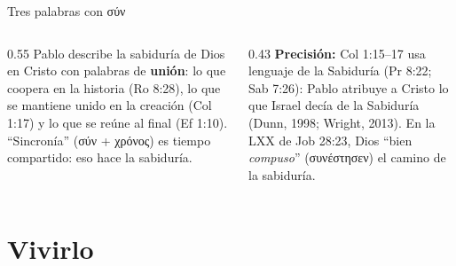 \documentclass[hyperref={bookmarks=false},aspectratio=169]{beamer}
\newcommand{\grc}[1]{\foreignlanguage{ancientgreek}{#1}}
\newcommand{\destacar}[1]{\textbf{\textcolor{azul}{#1}}}
\newcommand{\precision}[1]{{\footnotesize\color{gris}\textbf{Precisión:} #1}}
\begin{document}
\begin{frame}{Tres palabras con \grc{σύν}}
\centering
{}\par\medskip
\begin{columns}[t,onlytextwidth]
\begin{column}{0.55\textwidth}\small
Pablo describe la sabiduría de Dios en Cristo con palabras de \destacar{unión}: lo que coopera en la historia (Ro 8:28), lo que se mantiene unido en la creación (Col 1:17) y lo que se reúne al final (Ef 1:10). ``Sincronía'' (\grc{σύν} + \grc{χρόνος}) es tiempo compartido: eso hace la sabiduría.
\end{column}
\begin{column}{0.43\textwidth}
\precision{Col 1:15--17 usa lenguaje de la Sabiduría (Pr 8:22; Sab 7:26): Pablo atribuye a Cristo lo que Israel decía de la Sabiduría (Dunn, 1998; Wright, 2013). En la LXX de Job 28:23, Dios ``bien \emph{compuso}'' (\grc{συνέστησεν}) el camino de la sabiduría.}
\end{column}
\end{columns}
\end{frame}

\section{Vivirlo}
\end{document}
